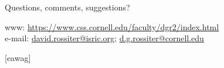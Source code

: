 \documentclass[aspectratio=169]{beamer}
\begin{document}
{  %
\begin{frame} 
\frametitle{}
\framesubtitle{}

 \begin{center}
 \vspace{0.5cm}
 \textcolor{isric_yellow}{\Large{Questions, comments, suggestions?}}
 \end{center}
\textcolor{isric_yellow}{www: \url{https://www.css.cornell.edu/faculty/dgr2/index.html}}
\\ 
\textcolor{isric_yellow}{e-mail: \url{david.rossiter@isric.org}; \url{d.g.rossiter@cornell.edu}}
\end{frame} 
}


[eawag] %
\end{document}
